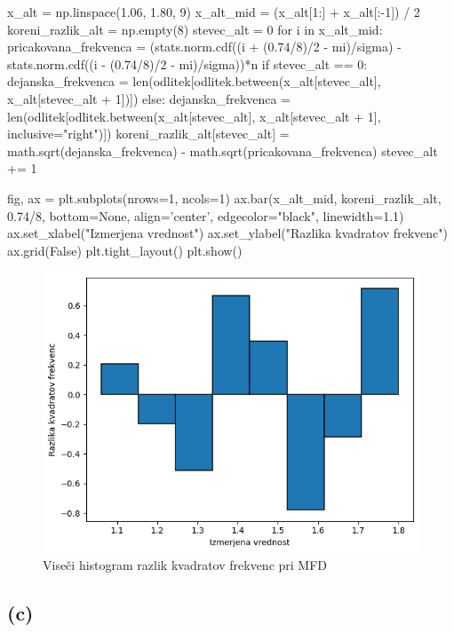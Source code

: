 \documentclass[10pt, a4paper]{article}
\begin{document}
\begin{python}
    x_alt = np.linspace(1.06, 1.80, 9)
    x_alt_mid = (x_alt[1:] + x_alt[:-1]) / 2
    koreni_razlik_alt = np.empty(8)
    stevec_alt = 0
    for i in x_alt_mid:
        pricakovana_frekvenca = (stats.norm.cdf((i + (0.74/8)/2 - mi)/sigma) - stats.norm.cdf((i - (0.74/8)/2 - mi)/sigma))*n
        if stevec_alt == 0:
            dejanska_frekvenca = len(odlitek[odlitek.between(x_alt[stevec_alt], x_alt[stevec_alt + 1])])
        else:
            dejanska_frekvenca = len(odlitek[odlitek.between(x_alt[stevec_alt], x_alt[stevec_alt + 1], inclusive="right")])
        koreni_razlik_alt[stevec_alt] = math.sqrt(dejanska_frekvenca) - math.sqrt(pricakovana_frekvenca)
        stevec_alt += 1

    fig, ax = plt.subplots(nrows=1, ncols=1)
    ax.bar(x_alt_mid, koreni_razlik_alt, 0.74/8, bottom=None, align='center', edgecolor="black", linewidth=1.1)
    ax.set_xlabel("Izmerjena vrednost")
    ax.set_ylabel("Razlika kvadratov frekvenc")
    ax.grid(False)
    plt.tight_layout()
    plt.show()
\end{python}

\begin{figure}[H]
    \centering
    \includegraphics[scale=0.75]{Images/2bii.png}
    \caption{Viseči histogram razlik kvadratov frekvenc pri MFD}
\end{figure}

\subsection*{(c)}
\end{document}
